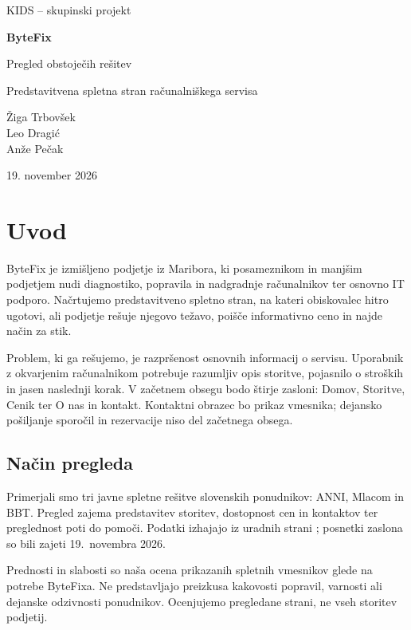 \documentclass[11pt,a4paper]{article}
\begin{document}
\begin{titlepage}
\centering
\vspace*{24mm}
{\large KIDS -- skupinski projekt\par}
\vspace{14mm}
{\Huge\bfseries ByteFix\par}
\vspace{7mm}
{\LARGE Pregled obstoječih rešitev\par}
\vspace{9mm}
{\large Predstavitvena spletna stran računalniškega servisa\par}
\vfill
{\large Žiga Trbovšek\\Leo Dragić\\Anže Pečak\par}
\vspace{14mm}
{19. november 2026\par}
\vspace{12mm}
\end{titlepage}

\section{Uvod}
ByteFix je izmišljeno podjetje iz Maribora, ki posameznikom in manjšim podjetjem nudi diagnostiko, popravila in nadgradnje računalnikov ter osnovno IT podporo. Načrtujemo predstavitveno spletno stran, na kateri obiskovalec hitro ugotovi, ali podjetje rešuje njegovo težavo, poišče informativno ceno in najde način za stik.

Problem, ki ga rešujemo, je razpršenost osnovnih informacij o servisu. Uporabnik z okvarjenim računalnikom potrebuje razumljiv opis storitve, pojasnilo o stroških in jasen naslednji korak. V začetnem obsegu bodo štirje zasloni: Domov, Storitve, Cenik ter O nas in kontakt. Kontaktni obrazec bo prikaz vmesnika; dejansko pošiljanje sporočil in rezervacije niso del začetnega obsega.

\subsection{Način pregleda}
Primerjali smo tri javne spletne rešitve slovenskih ponudnikov: ANNI, Mlacom in BBT. Pregled zajema predstavitev storitev, dostopnost cen in kontaktov ter preglednost poti do pomoči. Podatki izhajajo iz uradnih strani \cite{anni,mlacom,bbt}; posnetki zaslona so bili zajeti 19.~novembra 2026.

Prednosti in slabosti so naša ocena prikazanih spletnih vmesnikov glede na potrebe ByteFixa. Ne predstavljajo preizkusa kakovosti popravil, varnosti ali dejanske odzivnosti ponudnikov. Ocenjujemo pregledane strani, ne vseh storitev podjetij.
\end{document}
